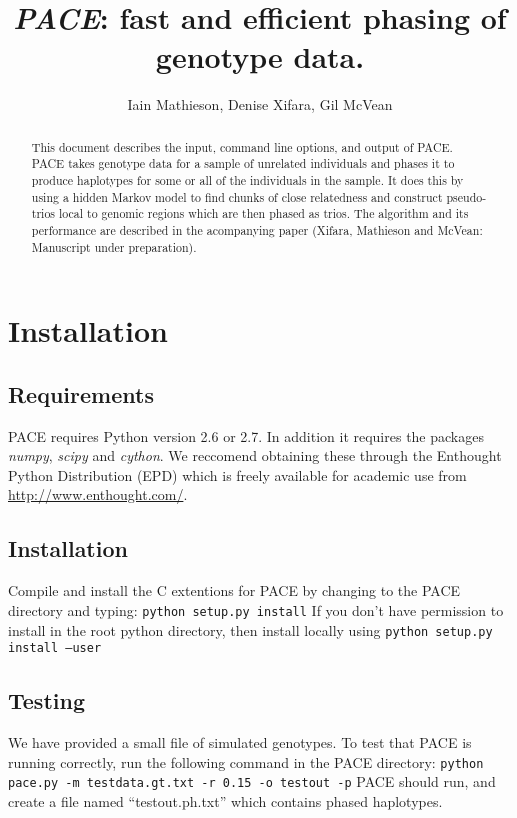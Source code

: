 \documentclass[10pt]{refart}
\title{\emph{PACE}: fast and efficient phasing of genotype data.}
\author{Iain Mathieson, Denise Xifara, Gil McVean}
\begin{document}
\maketitle

\begin{abstract}
  This document describes the input, command line options, and output of PACE. PACE takes genotype data for a sample of unrelated individuals and phases it to produce haplotypes for some or all of the individuals in the sample. It does this by using a hidden Markov model to find chunks of close relatedness and construct pseudo-trios local to genomic regions which are then phased as trios. The algorithm and its performance are described in the acompanying paper (Xifara, Mathieson and McVean: Manuscript under preparation).
\end{abstract}

\newpage
\tableofcontents
\newpage

\section{Installation}
\subsection{Requirements}
PACE requires Python version 2.6 or 2.7. In addition it requires the packages \emph{numpy}, \emph{scipy} and \emph{cython}. We reccomend obtaining these through the Enthought Python Distribution (EPD) which is freely available for academic use from \url{http://www.enthought.com/}.

\subsection{Installation}
Compile and install the C extentions for PACE by changing to the PACE directory and typing:
\newline
\newline
\texttt{python setup.py install}
\newline
\newline
If you don't have permission to install in the root python directory,
then install locally using
\newline
\newline
\texttt{python setup.py install --user} 
\subsection{Testing}
We have provided a small file of simulated genotypes. To test that PACE is running correctly, run the following command in the PACE directory:
\newline
\newline
\texttt{python pace.py -m testdata.gt.txt -r 0.15 -o testout -p}
\newline
\newline
PACE should run, and create a file named ``testout.ph.txt'' which contains phased haplotypes. 
\end{document}
